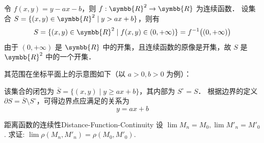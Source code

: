 \begin{myproof}
    令 $f(x, y) = y - ax - b$，则 $f: \symbb{R}^2 \to \symbb{R}$ 为连续函数．
    设集合 $S = \{ (x, y) \in \symbb{R}^2 \mid y > ax + b \}$，则有
    \begin{equation}
        S = \{ (x, y) \in \symbb{R}^2 \mid f(x, y) \in (0, +\infty) \} = f^{-1}\bigl( (0, +\infty) \bigr)
    \end{equation}
    由于 $(0, +\infty)$ 是 $\symbb{R}$ 中的开集，且连续函数的原像是开集，故 $S$ 是 $\symbb{R}^2$ 中的一个开集．

    其范围在坐标平面上的示意图如下（以 $a > 0, b > 0$ 为例）：
    \begin{center}
    \end{center}

    该集合的闭包为 $\overline{S} = \{ (x, y) \mid y \ge ax + b \}$，其内部为 $S^\circ = S$．
    根据边界的定义 $\partial S = \overline{S} \setminus S^\circ$，可得边界点应满足的关系为
    \begin{equation}
        \boxed{y = ax + b}
    \end{equation}
\end{myproof}


\begin{problem}{距离函数的连续性}{Distance-Function-Continuity}
    设 $\lim M_n = M_0, \lim M'_n = M'_0$. 求证: $\lim \rho(M_n, M'_n) = \rho(M_0, M'_0)$.
\end{problem}

